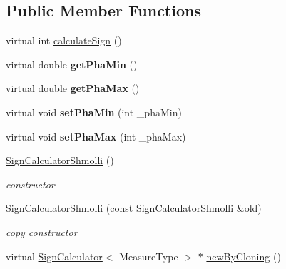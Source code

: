 \subsection*{Public Member Functions}
\begin{DoxyCompactItemize}
\item 
virtual int \hyperlink{class_ox_1_1_sign_calculator_shmolli_ab981a3a9790976de560609860f455edd}{calculate\+Sign} ()
\item 
virtual double {\bfseries get\+Pha\+Min} ()\hypertarget{class_ox_1_1_sign_calculator_shmolli_a5a5f6cf4ced27205484d352d1976adfc}{}\label{class_ox_1_1_sign_calculator_shmolli_a5a5f6cf4ced27205484d352d1976adfc}

\item 
virtual double {\bfseries get\+Pha\+Max} ()\hypertarget{class_ox_1_1_sign_calculator_shmolli_a2be49342f1408ad222588462afbc2602}{}\label{class_ox_1_1_sign_calculator_shmolli_a2be49342f1408ad222588462afbc2602}

\item 
virtual void {\bfseries set\+Pha\+Min} (int \+\_\+pha\+Min)\hypertarget{class_ox_1_1_sign_calculator_shmolli_aacfc207842127c87086f5595b9188acd}{}\label{class_ox_1_1_sign_calculator_shmolli_aacfc207842127c87086f5595b9188acd}

\item 
virtual void {\bfseries set\+Pha\+Max} (int \+\_\+pha\+Max)\hypertarget{class_ox_1_1_sign_calculator_shmolli_a3ec4977cf59bff37f95aa3fb1da1ae24}{}\label{class_ox_1_1_sign_calculator_shmolli_a3ec4977cf59bff37f95aa3fb1da1ae24}

\item 
\hyperlink{class_ox_1_1_sign_calculator_shmolli_a6ecfab9fb03fec0e62ad4951d5ab6c1b}{Sign\+Calculator\+Shmolli} ()\hypertarget{class_ox_1_1_sign_calculator_shmolli_a6ecfab9fb03fec0e62ad4951d5ab6c1b}{}\label{class_ox_1_1_sign_calculator_shmolli_a6ecfab9fb03fec0e62ad4951d5ab6c1b}

\begin{DoxyCompactList}\small\item\em constructor \end{DoxyCompactList}\item 
\hyperlink{class_ox_1_1_sign_calculator_shmolli_ae5b6751ae99992cc2075f0dc4b729605}{Sign\+Calculator\+Shmolli} (const \hyperlink{class_ox_1_1_sign_calculator_shmolli}{Sign\+Calculator\+Shmolli} \&old)\hypertarget{class_ox_1_1_sign_calculator_shmolli_ae5b6751ae99992cc2075f0dc4b729605}{}\label{class_ox_1_1_sign_calculator_shmolli_ae5b6751ae99992cc2075f0dc4b729605}

\begin{DoxyCompactList}\small\item\em copy constructor \end{DoxyCompactList}\item 
virtual \hyperlink{class_ox_1_1_sign_calculator}{Sign\+Calculator}$<$ Measure\+Type $>$ $\ast$ \hyperlink{class_ox_1_1_sign_calculator_shmolli_a9d9cd9b7107e43b4762846f54ff023d4}{new\+By\+Cloning} ()
\end{DoxyCompactItemize}

